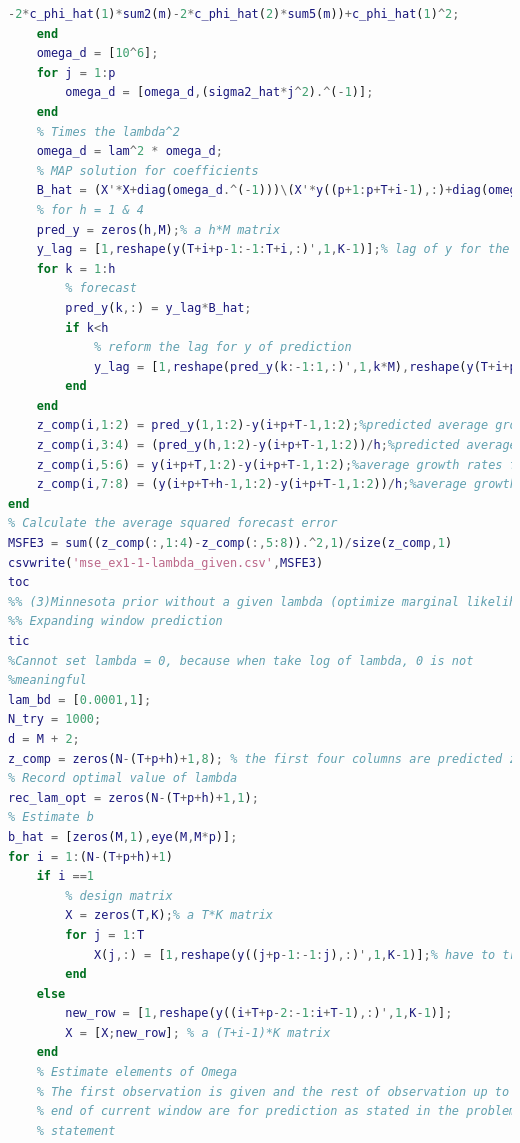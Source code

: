 \documentclass[11pt, oneside]{article}   	%
\begin{document}
\begin{lstlisting}[language=Matlab ,caption={Matlab code for problem 1.}, label={code:prob1}]
                        -2*c_phi_hat(1)*sum2(m)-2*c_phi_hat(2)*sum5(m))+c_phi_hat(1)^2;
    end
    omega_d = [10^6];
    for j = 1:p
        omega_d = [omega_d,(sigma2_hat*j^2).^(-1)];
    end
    % Times the lambda^2
    omega_d = lam^2 * omega_d;
    % MAP solution for coefficients
    B_hat = (X'*X+diag(omega_d.^(-1)))\(X'*y((p+1:p+T+i-1),:)+diag(omega_d.^(-1))*b_hat');% a K*M matrix
    % for h = 1 & 4
    pred_y = zeros(h,M);% a h*M matrix
    y_lag = [1,reshape(y(T+i+p-1:-1:T+i,:)',1,K-1)];% lag of y for the prediction
    for k = 1:h
        % forecast
        pred_y(k,:) = y_lag*B_hat;
        if k<h
            % reform the lag for y of prediction
            y_lag = [1,reshape(pred_y(k:-1:1,:)',1,k*M),reshape(y(T+i+p-1:-1:T+i+k,:)',1,K-1-k*M)];
        end
    end
    z_comp(i,1:2) = pred_y(1,1:2)-y(i+p+T-1,1:2);%predicted average growth rates for one quarter of (i) log-real GDP and (ii) log-GDP delector
    z_comp(i,3:4) = (pred_y(h,1:2)-y(i+p+T-1,1:2))/h;%predicted average growth rates for h quarters of (i) log-real GDP and (ii) log-GDP delector
    z_comp(i,5:6) = y(i+p+T,1:2)-y(i+p+T-1,1:2);%average growth rates for one quarter of (i) log-real GDP and (ii) log-GDP delector
    z_comp(i,7:8) = (y(i+p+T+h-1,1:2)-y(i+p+T-1,1:2))/h;%average growth rates for h quarters of (i) log-real GDP and (ii) log-GDP delector
end
% Calculate the average squared forecast error
MSFE3 = sum((z_comp(:,1:4)-z_comp(:,5:8)).^2,1)/size(z_comp,1)
csvwrite('mse_ex1-1-lambda_given.csv',MSFE3)
toc
%% (3)Minnesota prior without a given lambda (optimize marginal likelihood to get lambda each time)
%% Expanding window prediction
tic
%Cannot set lambda = 0, because when take log of lambda, 0 is not
%meaningful
lam_bd = [0.0001,1];
N_try = 1000;
d = M + 2;
z_comp = zeros(N-(T+p+h)+1,8); % the first four columns are predicted z (average growth rate of GDP) and the second four columns is the real z
% Record optimal value of lambda
rec_lam_opt = zeros(N-(T+p+h)+1,1);
% Estimate b
b_hat = [zeros(M,1),eye(M,M*p)];
for i = 1:(N-(T+p+h)+1)
    if i ==1
        % design matrix
        X = zeros(T,K);% a T*K matrix
        for j = 1:T
            X(j,:) = [1,reshape(y((j+p-1:-1:j),:)',1,K-1)];% have to transpose because the reshape function operate in column
        end
    else
        new_row = [1,reshape(y((i+T+p-2:-1:i+T-1),:)',1,K-1)];
        X = [X;new_row]; % a (T+i-1)*K matrix
    end
    % Estimate elements of Omega
    % The first observation is given and the rest of observation up to the
    % end of current window are for prediction as stated in the problem
    % statement

\end{lstlisting}
\end{document}
